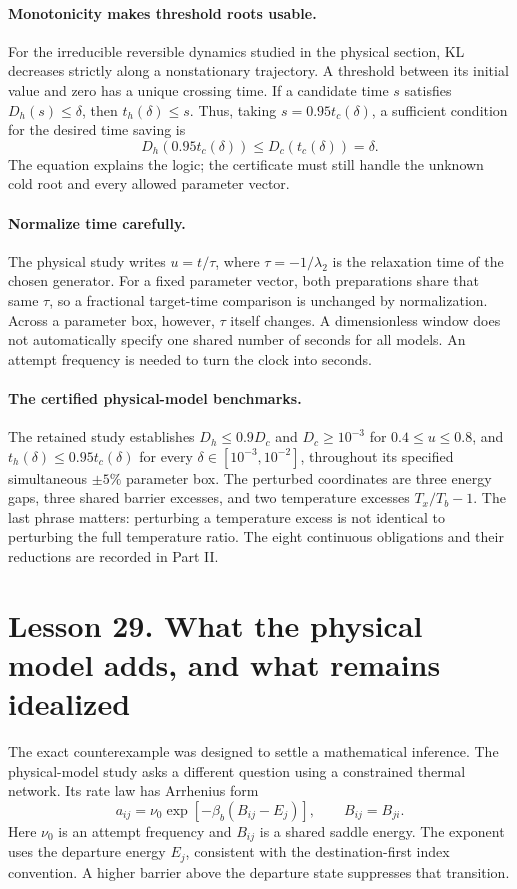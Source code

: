 \documentclass[11pt]{article}
\begin{document}
\paragraph{Monotonicity makes threshold roots usable.}
For the irreducible reversible dynamics studied in the physical section,
KL decreases strictly along a nonstationary trajectory. A threshold between
its initial value and zero has a unique crossing time. If a candidate time
$s$ satisfies $D_h(s)\leq\delta$, then $t_h(\delta)\leq s$.
Thus, taking $s=0.95t_c(\delta)$, a sufficient condition for the desired
time saving is
\[
D_h(0.95t_c(\delta))\leq D_c(t_c(\delta))=\delta.
\]
The equation explains the logic; the certificate must still handle the
unknown cold root and every allowed parameter vector.

\paragraph{Normalize time carefully.}
The physical study writes $u=t/\tau$, where
$\tau=-1/\lambda_2$ is the relaxation time of the chosen generator.
For a fixed parameter vector, both preparations share that same $\tau$,
so a fractional target-time comparison is unchanged by normalization.
Across a parameter box, however, $\tau$ itself changes. A dimensionless
window does not automatically specify one shared number of seconds for
all models. An attempt frequency is needed to turn the clock into seconds.

\paragraph{The certified physical-model benchmarks.}
The retained study establishes $D_h\leq0.9D_c$ and $D_c\geq10^{-3}$ for
$0.4\leq u\leq0.8$, and $t_h(\delta)\leq0.95t_c(\delta)$ for every
$\delta\in[10^{-3},10^{-2}]$, throughout its specified simultaneous
$\pm5\%$ parameter box. The perturbed coordinates are three energy gaps,
three shared barrier excesses, and two temperature excesses $T_x/T_b-1$.
The last phrase matters: perturbing a temperature excess is not identical
to perturbing the full temperature ratio. The eight continuous obligations
and their reductions are recorded in Part II.

\clearpage
\section*{Lesson 29. What the physical model adds, and what remains idealized}
The exact counterexample was designed to settle a mathematical inference.
The physical-model study asks a different question using a constrained
thermal network. Its rate law has Arrhenius form
\[
a_{ij}=\nu_0\exp[-\beta_b(B_{ij}-E_j)],\qquad B_{ij}=B_{ji}.
\]
Here $\nu_0$ is an attempt frequency and $B_{ij}$ is a shared saddle energy.
The exponent uses the departure energy $E_j$, consistent with the
 destination-first index convention. A higher barrier above the departure
state suppresses that transition.
\end{document}
